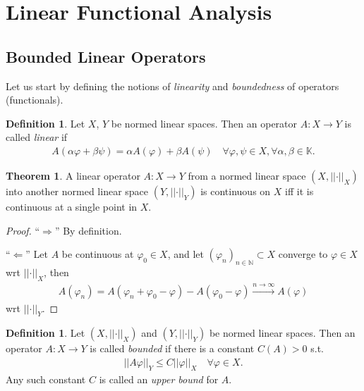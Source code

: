 \documentclass[12pt, a4paper]{article}
\numberwithin{equation}{section}
\theoremstyle{definition}
\theoremstyle{definition}
\newtheorem{defn}[thm]{Definition} %
\newtheorem{theorem}[thm]{Theorem}
\newcommand{\norm}[2]{\left\vert\left\vert #1 \right\vert\right\vert_{#2}}
\newcommand{\seq}[1][\varphi]{\left( #1 \right)_{n \in \mathbb{N}}}
\begin{document}
	\section{Linear Functional Analysis}

	\subsection{Bounded Linear Operators}

	Let us start by defining the notions of \textit{linearity} and \textit{boundedness} of operators (\mbox{functionals}). 
	
	\begin{defn}\label{defn:linearity_operator}
		Let $X$, $Y$ be normed linear spaces. Then an operator 
		$A:X\to Y$ is called \textit{linear} if 
		\begin{align}
			A(\alpha \varphi + \beta \psi) = \alpha A(\varphi) + \beta A(\psi) \quad \forall \varphi, \psi\in X, \forall \alpha, \beta\in \mathbb K.
		\end{align}
	\end{defn}

	\begin{theorem}
		A linear operator $A: X\to Y$ from a normed linear space $(X, \norm{\cdot}{X})$ into another normed linear space $(Y, \norm{\cdot}{Y})$ is continuous on $X$ iff it is continuous at a single point in $X$.
	\end{theorem}

	\begin{proof}
		\enquote{$\Longrightarrow$} By definition. 
		
		\enquote{$\Longleftarrow$} Let $A$ be continuous at $\varphi_0\in X$, and let $\seq[\varphi_n]\subset X$ converge to $\varphi\in X$ wrt $\norm{\cdot}{X}$, then
		\begin{align}
			A(\varphi_n) = A(\varphi_n + \varphi_0 - \varphi) - A(\varphi_0 - \varphi) \overset{n\to\infty}{\longrightarrow} A(\varphi)
		\end{align} 
		wrt $\norm{\cdot}{Y}$.
	\end{proof}
	
	\begin{defn}\label{defn:boundedness_operator}
		Let $\left(X, \norm{\cdot}{X}\right)$ and $(Y, \norm{\cdot}{Y})$ be normed linear spaces. Then an operator $A: X\to Y$ is called \textit{bounded} if there is a constant $C(A) > 0$ s.t. 
		\begin{align}
			\norm{A\varphi}{Y} \leq C \norm{\varphi}{X} \quad\forall \varphi\in X.
		\end{align}
		Any such constant $C$ is called an \textit{upper bound} for $A$.
	\end{defn}
\end{document}
